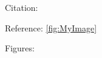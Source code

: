 \documentclass[RAIphdexpose%
              ,optCharter%
              ,optBiber%
              ,optBibstyleAlphabetic%
              ,optEnglish%
              ]{RAIlatex}%
\begin{document}
\section{}%
%
%
Citation: \cite{choset2005principles, thrun2005probabilistic}\par%
Reference: \cref{fig:MyImage}\par%
Figures:\par%
\end{document}
